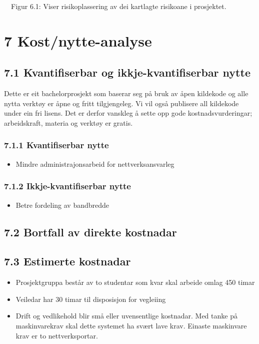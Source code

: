 \documentclass[12pt]{article}
\begin{document}
\ \ Figur 6.1: Viser risikoplassering av dei kartlagte risikoane i prosjektet.

\section{7 Kost/nytte-analyse}

\subsection{7.1 Kvantifiserbar og ikkje-kvantifiserbar nytte}

Dette er eit bachelorprosjekt som baserar seg på bruk av åpen kildekode og alle nytta verktøy er åpne og fritt tilgjengeleg. Vi vil også publisere all kildekode under ein fri lisens. Det er derfor vanskleg å sette opp gode kostnadsvurderingar; arbeidskraft, materia og verktøy er gratis. 

\subsubsection{7.1.1 Kvantifiserbar nytte}

\begin{itemize}
\item Mindre administrajonsarbeid for nettverksansvarleg
\end{itemize}
\subsubsection{7.1.2 Ikkje-kvantifiserbar nytte}

\begin{itemize}
\item Betre fordeling av bandbredde
\end{itemize}
\subsection{7.2 Bortfall av direkte kostnadar}




\subsection{7.3 Estimerte kostnadar}

\begin{itemize}
\item Prosjektgruppa består av to studentar som kvar skal arbeide omlag 450 timar
\item Veiledar har 30 timar til disposisjon for vegleiing
\item Drift og vedlikehold blir små eller uvensentlige kostnadar. Med tanke på maskinvarekrav skal dette systemet ha svært lave krav. Einaste maskinvare krav er to nettverksportar. 
\end{itemize}
\end{document}
